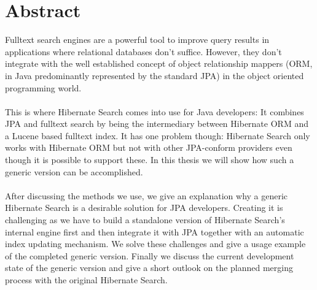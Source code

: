 \section*{Abstract}

Fulltext search engines are a powerful tool to improve query results in applications where relational databases don't suffice. However, they don't integrate with the well established concept of object relationship mappers (ORM, in Java predominantly represented by the standard JPA) in the object oriented programming world.
\\\\
This is where Hibernate Search comes into use for Java developers: It combines JPA and fulltext search by being the intermediary between Hibernate ORM and a Lucene based fulltext index. It has one problem though: Hibernate Search only works with Hibernate ORM but not with other JPA-conform providers even though it is possible to support these. In this thesis we will show how such a generic version can be accomplished.
\\\\
After discussing the methods we use, we give an explanation why a generic Hibernate Search is a desirable solution for JPA developers. Creating it is challenging as we have to build a standalone version of Hibernate Search's internal engine first and then integrate it with JPA together with an automatic index updating mechanism. We solve these challenges and give a usage example of the completed generic version. Finally we discuss the current development state of the generic version and give a short outlook on the planned merging process with the original Hibernate Search.

\pagebreak

